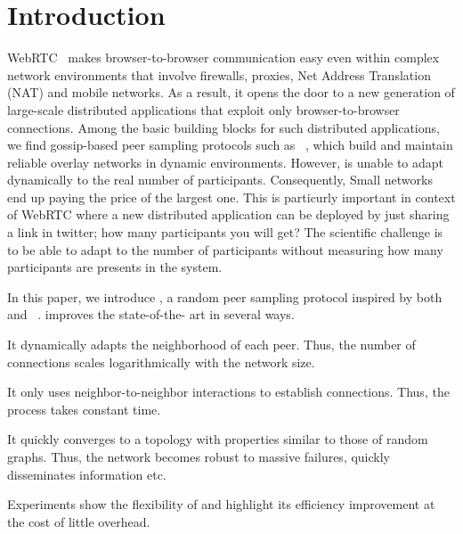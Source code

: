 
\section{Introduction}


WebRTC~\cite{webrtc} makes browser-to-browser communication easy even
within complex network environments that involve firewalls, proxies,
Net Address Translation (NAT) and mobile networks. As a result, it
opens the door to a new generation of large-scale distributed
applications that exploit only browser-to-browser connections. Among
the basic building blocks for such distributed applications, we find
gossip-based peer sampling protocols such as
\CYCLON~\cite{voulgaris2005cyclon}, which build and maintain reliable
overlay networks in dynamic environments. However, \CYCLON is unable
to adapt dynamically to the real number of participants. Consequently,
Small networks end up paying the price of the largest one. This is
particurly important in context of WebRTC where a new distributed
application can be deployed by just sharing a link in twitter; how
many participants you will get? The scientific challenge is to be able
to adapt to the number of participants without measuring how many
participants are presents in the system.


In this paper, we introduce \SPRAY, a random peer sampling protocol
inspired by both \SCAMP~\cite{ganesh2003peer} and
\CYCLON~\cite{voulgaris2005cyclon}. \SPRAY improves the state-of-the-
art in several ways. 
\begin{inparaenum}[(i)]
\item It dynamically adapts the neighborhood of each peer. Thus, the
  number of connections scales logarithmically with the network size.
\item It only uses neighbor-to-neighbor interactions to establish
  connections. Thus, the process takes constant time.
\item It quickly converges to a topology with properties similar to
  those of random graphs. Thus, the network becomes robust to massive
  failures, quickly disseminates information etc.
\item Experiments show the flexibility of \SPRAY and highlight its
  efficiency improvement at the cost of little overhead.
\end{inparaenum}


